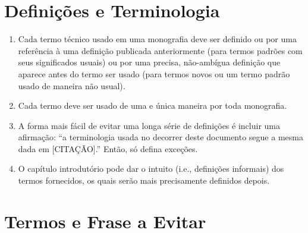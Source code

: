 \section{Definições e Terminologia}

\begin{enumerate}

	\item Cada termo técnico usado em uma monografia deve ser definido ou por uma referência à uma definição publicada anteriormente (para termos padrões com seus significados usuais)
	ou por uma precisa, não-ambígua definição que aparece antes do termo ser usado (para termos novos ou um termo padrão usado de maneira não usual).

	\item Cada termo deve ser usado de uma e única maneira por toda monografia.			

	\item A forma mais fácil de evitar uma longa série de definições é incluir uma afirmação: ``a terminologia usada no decorrer deste documento segue a mesma dada em [CITAÇÃO].''
	Então, só defina exceções.

	\item O capítulo introdutório pode dar o intuito (i.e., definições informais) dos termos fornecidos, os quais serão mais precisamente definidos depois.

\end{enumerate}

\section{Termos e Frase a Evitar}
	
